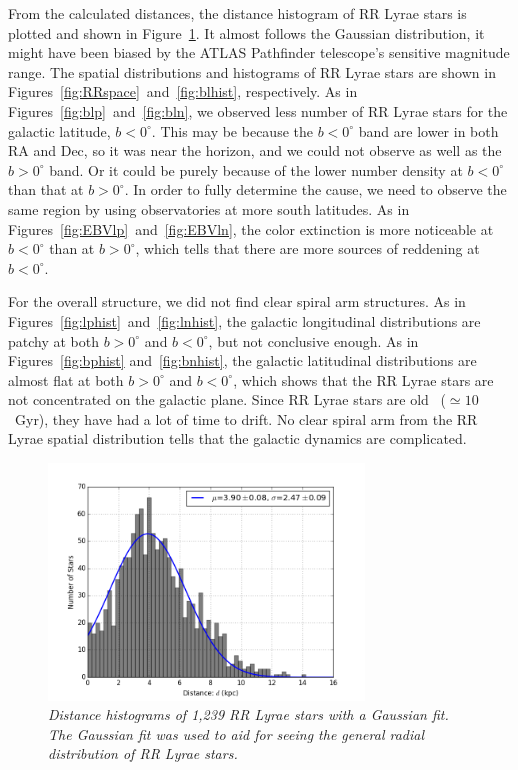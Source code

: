 \documentclass[aps,prb,twocolumn,superscriptaddress]{revtex4-1}
\begin{document}
From the calculated distances, the distance histogram of RR Lyrae stars is plotted and shown in Figure~\ref{fig:dhist}. It almost follows the Gaussian distribution, it might have been biased by the ATLAS Pathfinder telescope's sensitive magnitude range. The spatial distributions and histograms of RR Lyrae stars are shown in  Figures~\ref{fig:RRspace}~and~\ref{fig:blhist}, respectively. As in Figures~\ref{fig:blp}~and~\ref{fig:bln}, we observed less number of RR Lyrae stars for the galactic latitude, $b<0^{\circ}$. This may be because the $b<0^{\circ}$ band are lower in both RA and Dec, so it was near the horizon, and we could not observe as well as the $b>0^{\circ}$ band. Or it could be purely because of the lower number density at $b<0^{\circ}$ than that at $b>0^{\circ}$. In order to fully determine the cause, we need to observe the same region by using observatories at more south latitudes. As in Figures~\ref{fig:EBVlp}~and~\ref{fig:EBVln}, the color extinction is more noticeable at $b<0^{\circ}$ than at $b>0^{\circ}$, which tells that there are more sources of reddening at $b<0^{\circ}$.

\indent For the overall structure, we did not find clear spiral arm structures. As in Figures~\ref{fig:lphist}~and~\ref{fig:lnhist}, the galactic longitudinal distributions are patchy at both $b>0^{\circ}$ and $b<0^{\circ}$, but not conclusive enough.  As in Figures~\ref{fig:bphist} and~\ref{fig:bnhist}, the galactic latitudinal distributions are almost flat at both $b>0^{\circ}$ and $b<0^{\circ}$, which shows that the RR Lyrae stars are not concentrated on the galactic plane. Since RR Lyrae stars are old~\cite{Astro} ($\simeq 10$~Gyr), they have had a lot of time to drift. No clear spiral arm from the RR Lyrae spatial distribution tells that the galactic dynamics are complicated.




\begin{figure}[H]
 \centering
 	\includegraphics[width=3.3in]{figures/PlotsSpace15/gdhist_limit15.png}
 \caption{\it \small{Distance histograms of 1,239 RR Lyrae stars with a Gaussian fit. The Gaussian fit was used to aid for seeing the general radial distribution of RR Lyrae stars. }} 
 \label{fig:dhist}
\end{figure} 
\end{document}
